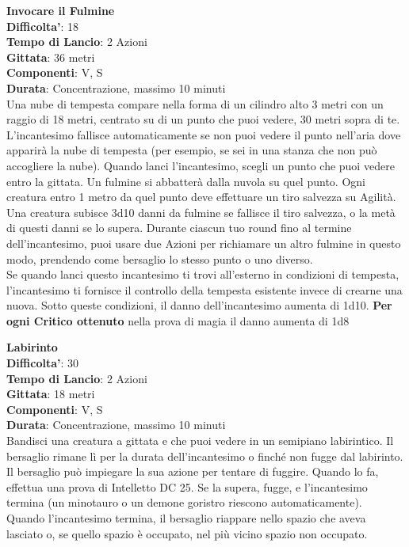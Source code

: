 \begin{multicols}{2}
\medskip\textbf{Invocare il Fulmine}\\
\textbf{Difficolta'}: 18\\
\textbf{Tempo di Lancio}: 2 Azioni\\
\textbf{Gittata}: 36 metri\\
\textbf{Componenti}: V, S\\
\textbf{Durata}: Concentrazione, massimo 10 minuti\\
Una nube di tempesta compare nella forma di un cilindro alto 3 metri con un raggio di 18 metri, centrato su di un punto che puoi vedere, 30 metri sopra di te. L’incantesimo fallisce automaticamente se non puoi vedere il punto nell’aria dove apparirà la nube di tempesta (per esempio, se sei in una stanza che non può accogliere la nube). Quando lanci l’incantesimo, scegli un punto che puoi vedere entro la gittata. Un fulmine si abbatterà dalla nuvola su quel punto. Ogni creatura entro 1 metro da  quel punto deve effettuare un tiro salvezza su Agilità. Una creatura  subisce 3d10 danni da fulmine se fallisce il tiro salvezza, o la metà di questi danni se lo supera. Durante ciascun tuo round fino al termine dell’incantesimo, puoi usare due Azioni per richiamare un altro fulmine in questo modo, prendendo come bersaglio lo stesso punto o uno diverso.\\
Se quando lanci questo incantesimo ti trovi all’esterno in condizioni di tempesta, l’incantesimo ti fornisce il controllo della tempesta esistente invece di crearne una nuova. Sotto queste condizioni, il danno dell’incantesimo aumenta di 1d10. 
\textbf{Per ogni Critico ottenuto} nella prova di magia il danno aumenta di 1d8

\medskip\textbf{Labirinto}\\
\textbf{Difficolta'}: 30\\
\textbf{Tempo di Lancio}: 2 Azioni\\
\textbf{Gittata}: 18 metri\\
\textbf{Componenti}: V, S\\
\textbf{Durata}: Concentrazione, massimo 10 minuti\\
Bandisci una creatura a gittata e che puoi vedere in un semipiano labirintico. Il bersaglio rimane lì per la durata dell’incantesimo o finché non fugge dal labirinto. Il bersaglio può impiegare la sua azione per tentare di fuggire. Quando lo fa, effettua una prova di Intelletto DC 25. Se la supera, fugge, e l’incantesimo termina (un minotauro o un demone goristro riescono automaticamente).\\
Quando l’incantesimo termina, il bersaglio riappare nello spazio che aveva lasciato o, se quello spazio è occupato, nel più vicino spazio non occupato. 


\end{multicols}
